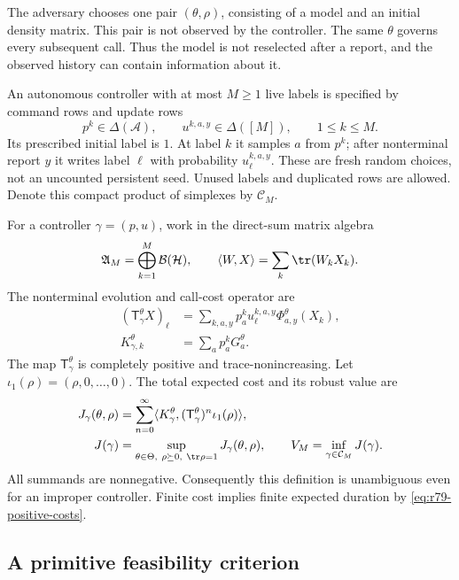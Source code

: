 The adversary chooses one pair $(\theta,\rho)$, consisting of a
model and an initial density matrix.  This pair is not observed by
the controller.  The same $\theta$ governs every subsequent call.
Thus the model is not reselected after a report, and the observed
history can contain information about it.

An autonomous controller with at most $M\ge1$ live labels is specified
by command rows and update rows
\begin{equation}\label{eq:r79-controller-parameters}
 p^k\in\Delta(\mathcal A),\qquad
 u^{k,a,y}\in\Delta([M]),\qquad 1\le k\le M.
\end{equation}
Its prescribed initial label is $1$.  At label $k$ it samples $a$
from $p^k$; after nonterminal report $y$ it writes label $\ell$ with
probability $u^{k,a,y}_\ell$.  These are fresh random choices, not an
uncounted persistent seed.  Unused labels and duplicated rows are
allowed.  Denote this compact product of simplexes by $\mathcal C_M$.

For a controller $\gamma=(p,u)$, work in the direct-sum matrix algebra
\[
 \mathfrak A_M=\bigoplus_{k=1}^M\mathcal B(\mathcal H),
 \qquad
 \langle W,X\rangle=\sum_k\tr(W_kX_k).
\]
The nonterminal evolution and call-cost operator are
\begin{align}
 (\mathsf T^\theta_\gamma X)_\ell
   &=\sum_{k,a,y}p^k_a u^{k,a,y}_\ell
                         \Phi^\theta_{a,y}(X_k),
       \label{eq:r79-product-map}\\
 K^\theta_{\gamma,k}&=\sum_a p^k_aG^\theta_a.
       \label{eq:r79-product-cost}
\end{align}
The map $\mathsf T^\theta_\gamma$ is completely positive and
trace-nonincreasing.  Let $\iota_1(\rho)=(\rho,0,\ldots,0)$.
The total expected cost and its robust value are
\begin{align}
 J_\gamma(\theta,\rho)
   &=\sum_{n=0}^\infty
       \langle K^\theta_\gamma,
          (\mathsf T^\theta_\gamma)^n\iota_1(\rho)\rangle,
          \label{eq:r79-total-cost}\\
 J(\gamma)&=\sup_{\theta\in\Theta,\ \rho\succeq0,\ \tr\rho=1}
                       J_\gamma(\theta,\rho),
 \qquad V_M=\inf_{\gamma\in\mathcal C_M}J(\gamma).
          \label{eq:r79-general-frontier}
\end{align}
All summands are nonnegative.  Consequently this definition is
unambiguous even for an improper controller.  Finite cost implies
finite expected duration by \eqref{eq:r79-positive-costs}.

\subsection{A primitive feasibility criterion}


